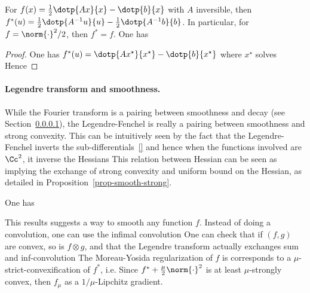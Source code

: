\begin{prop}\label{eq-example-legendre}
	For $f(x)=\frac{1}{2}\dotp{Ax}{x} - \dotp{b}{x}$ with $A$ inversible, then $f^*(u) = \frac{1}{2}\dotp{A^{-1} u}{u} - \frac{1}{2}\dotp{A^{-1} b}{b}$.
	In particular, for $f=\norm{\cdot}^2/2$, then $f^*=f$. 
	One has
\end{prop}
\begin{proof}
	One has $f^*(u) = \dotp{Ax^\star}{x^\star} - \dotp{b}{x^\star}$ where $x^\star$ solves
	Hence
	
\end{proof}

\paragraph{Legendre transform and smoothness.}

While the Fourier transform is a pairing between smoothness and decay (see Section~\ref{}), the Legendre-Fenchel is really a pairing between smoothness and strong convexity. This can be intuitively seen by the fact that the Legendre-Fenchel inverts the sub-differentials~\eqref{} and hence when the functions involved are $\Cc^2$, it inverse the Hessians 
This relation between Hessian can be seen as implying the exchange of strong convexity and uniform bound on the Hessian, as detailed in Proposition~\ref{prop-smooth-strong}.

\begin{prop}
	One has
\end{prop}

This results suggests a way to smooth any function $f$. Instead of doing a convolution, one can use the infimal convolution
One can check that if $(f,g)$ are convex, so is $f \otimes g$, and that the Legendre transform actually exchanges sum and inf-convolution
The Moreau-Yosida regularization of $f$ is corresponds to a $\mu$-strict-convexification of $f^*$, i.e.
Since $f^* + \frac{\mu}{2}\norm{\cdot}^2$ is at least $\mu$-strongly convex, then $f_\mu$ as a $1/\mu$-Lipchitz gradient.

